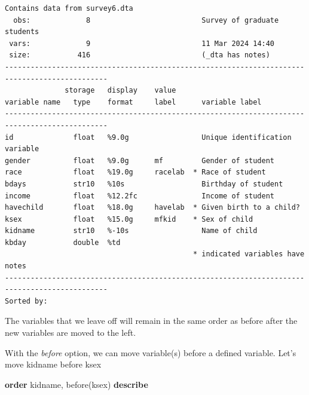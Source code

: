 \documentclass[
]{book}
\newenvironment{Shaded}{\begin{snugshade}}{\end{snugshade}}
\newcommand{\KeywordTok}[1]{\textcolor[rgb]{0.13,0.29,0.53}{\textbf{#1}}}
\newcommand{\NormalTok}[1]{#1}
\begin{document}
\begin{verbatim}
Contains data from survey6.dta
  obs:             8                          Survey of graduate students
 vars:             9                          11 Mar 2024 14:40
 size:           416                          (_dta has notes)
----------------------------------------------------------------------------------------------
              storage   display    value
variable name   type    format     label      variable label
----------------------------------------------------------------------------------------------
id              float   %9.0g                 Unique identification variable
gender          float   %9.0g      mf         Gender of student
race            float   %19.0g     racelab  * Race of student
bdays           str10   %10s                  Birthday of student
income          float   %12.2fc               Income of student
havechild       float   %18.0g     havelab  * Given birth to a child?
ksex            float   %15.0g     mfkid    * Sex of child
kidname         str10   %-10s                 Name of child
kbday           double  %td                   
                                            * indicated variables have notes
----------------------------------------------------------------------------------------------
Sorted by: 
\end{verbatim}

The variables that we leave off will remain in the same order as before after the new variables are moved to the left.

With the \emph{before} option, we can move variable(s) before a defined variable. Let's move kidname before ksex

\begin{Shaded}
\begin{Highlighting}[]
\KeywordTok{order}\NormalTok{ kidname, before(ksex)}
\KeywordTok{describe}
\end{Highlighting}
\end{Shaded}
\end{document}
